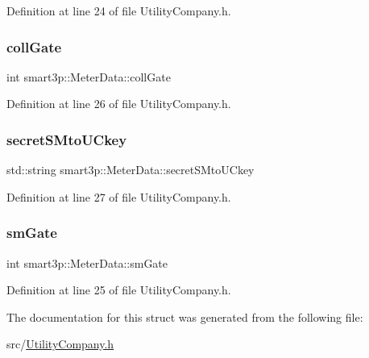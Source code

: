Definition at line 24 of file Utility\+Company.\+h.

\mbox{\label{structsmart3p_1_1MeterData_a392073328355e46eb0551cbf86240271}} 
\subsubsection{\texorpdfstring{coll\+Gate}{collGate}}
{\footnotesize\ttfamily int smart3p\+::\+Meter\+Data\+::coll\+Gate}



Definition at line 26 of file Utility\+Company.\+h.

\mbox{\label{structsmart3p_1_1MeterData_af2911cd1e548048afd2532aba4d04ce4}} 
\subsubsection{\texorpdfstring{secret\+S\+Mto\+U\+Ckey}{secretSMtoUCkey}}
{\footnotesize\ttfamily std\+::string smart3p\+::\+Meter\+Data\+::secret\+S\+Mto\+U\+Ckey}



Definition at line 27 of file Utility\+Company.\+h.

\mbox{\label{structsmart3p_1_1MeterData_a6052855ee577dcdd538605f71d8424a4}} 
\subsubsection{\texorpdfstring{sm\+Gate}{smGate}}
{\footnotesize\ttfamily int smart3p\+::\+Meter\+Data\+::sm\+Gate}



Definition at line 25 of file Utility\+Company.\+h.



The documentation for this struct was generated from the following file\+:\begin{DoxyCompactItemize}
\item 
src/\hyperlink{UtilityCompany_8h}{Utility\+Company.\+h}\end{DoxyCompactItemize}
